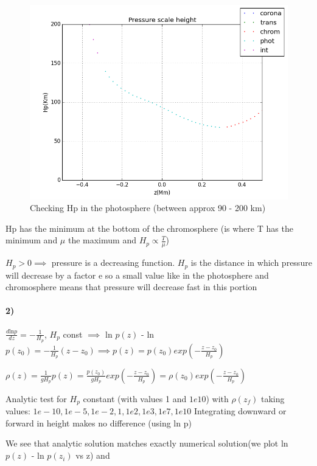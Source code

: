 \documentclass[10pt]{book}
\begin{document}
\begin{figure}[H]
 \centering
 \includegraphics[scale=0.5]{hpLayersPart.png}
 \caption{Checking Hp in the photosphere (between approx 90 - 200 km)}
\end{figure}

Hp has the minimum at the bottom of the chromosphere (is where T has the minimum and $\mu$ the maximum and  $H_p \propto \frac{T}{\mu}$)

$H_p > 0 \implies $ pressure is a decreasing function. $H_p$ is the distance in which pressure will decrease by a factor e 
so a small value  like in the photosphere and chromosphere means that pressure will decrease fast in this portion




\paragraph{2)}

$\frac{d \text{ln} p}{dz} = -\frac{1}{H_p}$, $H_p$ const $\implies$ ln $p(z)$ - ln $ p(z_0) = -\frac{1}{H_p}(z-z_0) \implies p(z) = p(z_0) exp(-\frac{z-z_0}{H_p})$  

$\rho(z) =  \frac{1}{g H_p}p(z) = \frac{p(z_0)}{g H_p} exp(-\frac{z-z_0}{H_p}) = \rho(z_0) exp(-\frac{z-z_0}{H_p})$ 

Analytic test for $H_p$ constant (with values 1 and $1e10$) with $\rho(z_f)$ taking values: $1e-10, 1e-5, 1e-2,1, 1e2,1e3, 1e7, 1e10$
Integrating downward or forward in height makes no difference (using ln p)

We see that analytic solution matches exactly numerical solution(we plot ln $p(z)$ - ln $ p(z_i)$ vs z) and 
\end{document}
